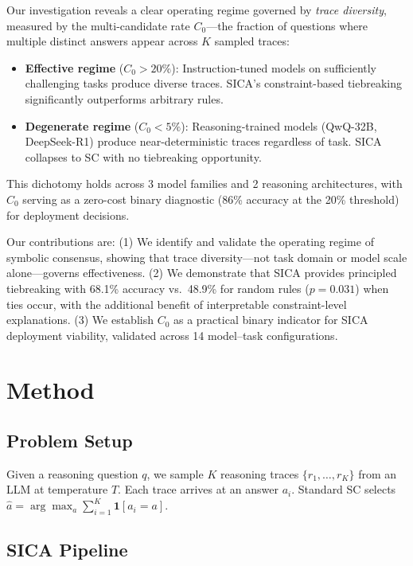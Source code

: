 \documentclass[11pt,a4paper]{article}
\begin{document}
Our investigation reveals a clear operating regime governed by \emph{trace diversity}, measured by the multi-candidate rate $C_0$---the fraction of questions where multiple distinct answers appear across $K$ sampled traces:

\begin{itemize}
\item \textbf{Effective regime} ($C_0 > 20\%$): Instruction-tuned models on sufficiently challenging tasks produce diverse traces. SICA's constraint-based tiebreaking significantly outperforms arbitrary rules.
\item \textbf{Degenerate regime} ($C_0 < 5\%$): Reasoning-trained models (QwQ-32B, DeepSeek-R1) produce near-deterministic traces regardless of task. SICA collapses to SC with no tiebreaking opportunity.
\end{itemize}

This dichotomy holds across 3 model families and 2 reasoning architectures, with $C_0$ serving as a zero-cost binary diagnostic (86\% accuracy at the 20\% threshold) for deployment decisions.

Our contributions are:
(1) We identify and validate the operating regime of symbolic consensus, showing that trace diversity---not task domain or model scale alone---governs effectiveness.
(2) We demonstrate that SICA provides principled tiebreaking with 68.1\% accuracy vs.\ 48.9\% for random rules ($p=0.031$) when ties occur, with the additional benefit of interpretable constraint-level explanations.
(3) We establish $C_0$ as a practical binary indicator for SICA deployment viability, validated across 14 model--task configurations.

\section{Method}

\subsection{Problem Setup}

Given a reasoning question $q$, we sample $K$ reasoning traces $\{r_1, \ldots, r_K\}$ from an LLM at temperature $T$. Each trace arrives at an answer $a_i$. Standard SC selects $\hat{a} = \arg\max_a \sum_{i=1}^K \mathbf{1}[a_i = a]$.

\subsection{SICA Pipeline}
\end{document}
